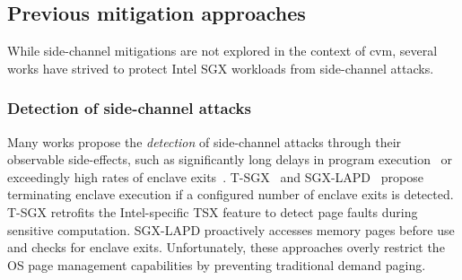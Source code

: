 

\subsection{Previous mitigation approaches}
\label{sec:background:mitigations}
While side-channel mitigations are not explored in the context of \gls{cvm}, several works have strived to protect Intel SGX workloads from side-channel attacks.

\subsubsection{Detection of side-channel attacks}
Many works propose the \emph{detection} of side-channel attacks through their observable side-effects, such as significantly long delays in program execution~\cite{dejavu} or exceedingly high rates of enclave exits~\cite{oleksenko2018varys,shih2017tsgx}.
T-SGX~\cite{shih2017tsgx} and SGX-LAPD~\cite{fu2017sgxlapd} propose terminating enclave execution if a configured number of enclave exits is detected.
T-SGX retrofits the Intel-specific TSX feature to detect page faults during sensitive computation.
SGX-LAPD proactively accesses memory pages before use and checks for enclave exits.
Unfortunately, these approaches overly restrict the OS page management capabilities by preventing traditional demand paging.

